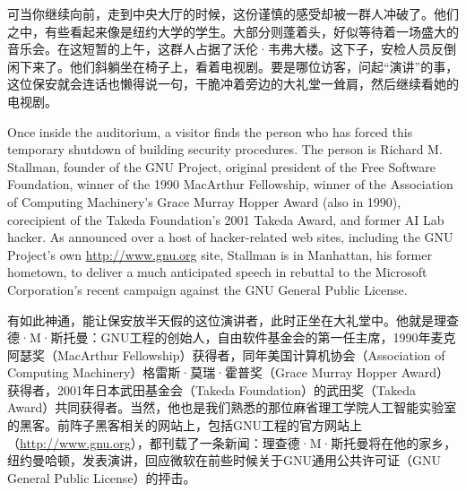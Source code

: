 \ifdefined\chs
可当你继续向前，走到中央大厅的时候，这份谨慎的感受却被一群人冲破了。他们之中，有些看起来像是纽约大学的学生。大部分则蓬着头，好似等待着一场盛大的音乐会。在这短暂的上午，这群人占据了沃伦·韦弗大楼。这下子，安检人员反倒闲下来了。他们斜躺坐在椅子上，看着电视剧。要是哪位访客，问起``演讲''的事，这位保安就会连话也懒得说一句，干脆冲着旁边的大礼堂一耸肩，然后继续看她的电视剧。
\fi

\ifdefined\eng
Once inside the auditorium, a visitor finds the person who has forced this temporary shutdown of building security procedures. The person is Richard M. Stallman, founder of the GNU Project, original president of the Free Software Foundation, winner of the 1990 MacArthur Fellowship, winner of the Association of Computing Machinery's Grace Murray Hopper Award (also in 1990), corecipient of the Takeda Foundation's 2001 Takeda Award, and former AI Lab hacker. As announced over a host of hacker-related web sites, including the GNU Project's own \url{http://www.gnu.org} site, Stallman is in Manhattan, his former hometown, to deliver a much anticipated speech in rebuttal to the Microsoft Corporation's recent campaign against the GNU General Public License.
\fi

\ifdefined\chs
有如此神通，能让保安放半天假的这位演讲者，此时正坐在大礼堂中。他就是理查德·M·斯托曼：GNU工程的创始人，自由软件基金会的第一任主席，1990年麦克阿瑟奖（MacArthur Fellowship）获得者，同年美国计算机协会（Association of Computing Machinery）格雷斯·莫瑞·霍普奖（Grace Murray Hopper Award）获得者，2001年日本武田基金会（Takeda Foundation）的武田奖（Takeda Award）共同获得者。当然，他也是我们熟悉的那位麻省理工学院人工智能实验室的黑客。前阵子黑客相关的网站上，包括GNU工程的官方网站上（\url{http://www.gnu.org}），都刊载了一条新闻：理查德·M·斯托曼将在他的家乡，纽约曼哈顿，发表演讲，回应微软在前些时候关于GNU通用公共许可证（GNU General Public License）的抨击。
\fi

